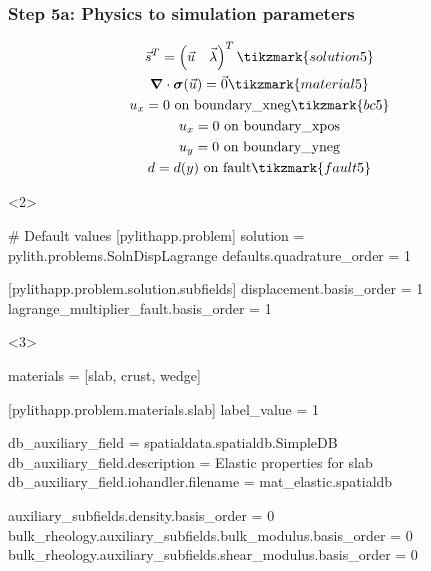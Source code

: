 \documentclass[aspectratio=169]{beamer}
\begin{document}
\begin{frame}[t,fragile]
  \frametitle{Step 5a: Physics to simulation parameters}
  \summary{}

  \begin{minipage}[t]{0.3\textwidth}
    {\scriptsize
    \begin{gather*}
    \vec{s}^T = \left( \vec{u} \quad \vec{\lambda} \right)^T \tikzmark{solution5}\\
    \tensor{\nabla} \cdot \tensor{\sigma}(\vec{u}) = \vec{0} \tikzmark{material5}\\
    u_x = 0 \text{ on boundary\_xneg} \tikzmark{bc5}\\
    u_x = 0 \text{ on boundary\_xpos} \\
    u_y = 0 \text{ on boundary\_yneg} \\
    d = d(y) \text{ on fault} \tikzmark{fault5}
    \end{gather*}}
  \end{minipage}
  \hfill
  \begin{minipage}[t]{0.67\textwidth}
    \begin{onlyenv}<2>
      \begin{cfgcode}
        # Default values
        [pylithapp.problem]
        solution = pylith.problems.SolnDispLagrange
        defaults.quadrature_order = 1
        
        [pylithapp.problem.solution.subfields]
        displacement.basis_order = 1
        lagrange_multiplier_fault.basis_order = 1
      \end{cfgcode}
    \end{onlyenv}
    \begin{onlyenv}<3>
      \begin{cfgcode}
        materials = [slab, crust, wedge]

        [pylithapp.problem.materials.slab]
        label_value = 1

        db_auxiliary_field = spatialdata.spatialdb.SimpleDB
        db_auxiliary_field.description = Elastic properties for slab
        db_auxiliary_field.iohandler.filename = mat_elastic.spatialdb

        auxiliary_subfields.density.basis_order = 0
        bulk_rheology.auxiliary_subfields.bulk_modulus.basis_order = 0
        bulk_rheology.auxiliary_subfields.shear_modulus.basis_order = 0


\end{cfgcode}
\end{onlyenv}
\end{minipage}
\end{frame}
\end{document}
